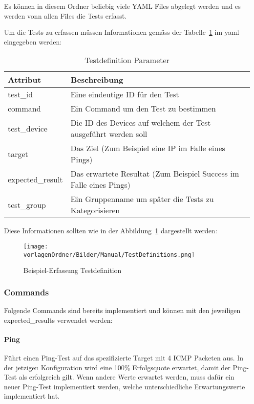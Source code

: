 \documentclass[]{subfiles}
\begin{document}
	Es können in diesem Ordner beliebig viele YAML Files abgelegt werden und es werden vonn allen Files die Tests erfasst.

	Um die Tests zu erfassen müssen Informationen gemäss der Tabelle~\ref{table:TestDefinitionParameter} im yaml eingegeben werden:

	\begin{table}[h!]
		\begin{tabularx}{\textwidth}{ll}
		\toprule
		Attribut & Beschreibung \\
		\midrule
		test\_id & Eine eindeutige ID für den Test \\
		command & Ein Command um den Test zu bestimmen \\
		test\_device & Die ID des Devices auf welchem der Test ausgeführt werden soll\\
		target & Das Ziel (Zum Beispiel eine IP im Falle eines Pings)\\
		expected\_result & Das erwartete Resultat (Zum Beispiel Success im Falle eines Pings)\\
		test\_group & Ein Gruppenname um später die Tests zu Kategorisieren\\
		\midrule
		\end{tabularx}
		\caption{Testdefinition Parameter}
		\label{table:TestDefinitionParameter}
	\end{table}
	

	Diese Informationen sollten wie in der Abbildung~\ref{fig:TestDefinitionErfassung} dargestellt werden: 

	\begin{figure}[h!]
		\begin{center}
			\texttt{[image: \\vorlagenOrdner/Bilder/Manual/TestDefinitions.png]}
			\caption{Beispiel-Erfassung Testdefinition}
			\label{fig:TestDefinitionErfassung}
		\end{center}
	\end{figure}
	\newpage

	\subsubsection{Commands}
		Folgende Commands sind bereits implementiert und können mit den jeweiligen expected\_results verwendet werden:
		\paragraph*{Ping}
			Führt einen Ping-Test auf das spezifizierte Target mit 4 ICMP Packeten aus.
			In der jetzigen Konfiguration wird eine 100\% Erfolgsquote erwartet, 
			damit der Ping-Test als erfolgreich gilt.
			Wenn andere Werte erwartet werden, muss dafür ein neuer Ping-Test implementiert
			werden, welche unterschiedliche Erwartungswerte implementiert hat.
\end{document}
